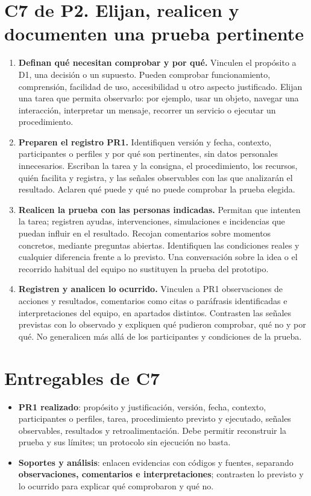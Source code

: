 \section*{C7 de P2. Elijan, realicen y documenten una prueba pertinente}
\begin{enumerate}[series=pasos]
\item \textbf{Definan qué necesitan comprobar y por qué.} Vinculen el propósito a D1, una decisión o un supuesto. Pueden comprobar funcionamiento, comprensión, facilidad de uso, accesibilidad u otro aspecto justificado. Elijan una tarea que permita observarlo: por ejemplo, usar un objeto, navegar una interacción, interpretar un mensaje, recorrer un servicio o ejecutar un procedimiento.
\item \textbf{Preparen el registro PR1.} Identifiquen versión y fecha, contexto, participantes o perfiles y por qué son pertinentes, sin datos personales innecesarios. Escriban la tarea y la consigna, el procedimiento, los recursos, quién facilita y registra, y las señales observables con las que analizarán el resultado. Aclaren qué puede y qué no puede comprobar la prueba elegida.
\item \textbf{Realicen la prueba con las personas indicadas.} Permitan que intenten la tarea; registren ayudas, intervenciones, simulaciones e incidencias que puedan influir en el resultado. Recojan comentarios sobre momentos concretos, mediante preguntas abiertas. Identifiquen las condiciones reales y cualquier diferencia frente a lo previsto. Una conversación sobre la idea o el recorrido habitual del equipo no sustituyen la prueba del prototipo.
\item \textbf{Registren y analicen lo ocurrido.} Vinculen a PR1 observaciones de acciones y resultados, comentarios como citas o paráfrasis identificadas e interpretaciones del equipo, en apartados distintos. Contrasten las señales previstas con lo observado y expliquen qué pudieron comprobar, qué no y por qué. No generalicen más allá de los participantes y condiciones de la prueba.
\end{enumerate}

\section*{Entregables de C7}
\begin{itemize}
\item \textbf{PR1 realizado}: propósito y justificación, versión, fecha, contexto, participantes o perfiles, tarea, procedimiento previsto y ejecutado, señales observables, resultados y retroalimentación. Debe permitir reconstruir la prueba y sus límites; un protocolo sin ejecución no basta.
\item \textbf{Soportes y análisis}: enlacen evidencias con códigos y fuentes, separando \textbf{observaciones, comentarios e interpretaciones}; contrasten lo previsto y lo ocurrido para explicar qué comprobaron y qué no.
\end{itemize}

